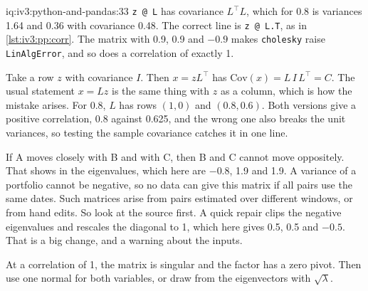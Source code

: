 \begin{solution}{iq:iv3:python-and-pandas:33}
\texttt{z @ L} has covariance $L^\top L$, which for 0.8 is variances 1.64 and 0.36 with covariance 0.48. The correct line is \texttt{z @ L.T}, as in \cref{lst:iv3:pp:corr}. The matrix with 0.9, 0.9 and $-0.9$ makes \texttt{cholesky} raise \texttt{LinAlgError}, and so does a correlation of exactly 1.
\label{lst:iv3:pp:corr}

Take a row $z$ with covariance $I$. Then $x = z L^\top$ has $\text{Cov}(x) = L\, I\, L^\top = C$. The usual statement $x = L z$ is the same thing with $z$ as a column, which is how the mistake arises. For 0.8, $L$ has rows $(1, 0)$ and $(0.8, 0.6)$. Both versions give a positive correlation, 0.8 against 0.625, and the wrong one also breaks the unit variances, so testing the sample covariance catches it in one line.

If A moves closely with B and with C, then B and C cannot move oppositely. That shows in the eigenvalues, which here are $-0.8$, 1.9 and 1.9. A variance of a portfolio cannot be negative, so no data can give this matrix if all pairs use the same dates. Such matrices arise from pairs estimated over different windows, or from hand edits. So look at the source first. A quick repair clips the negative eigenvalues and rescales the diagonal to 1, which here gives 0.5, 0.5 and $-0.5$. That is a big change, and a warning about the inputs.

At a correlation of 1, the matrix is singular and the factor has a zero pivot. Then use one normal for both variables, or draw from the eigenvectors with $\sqrt{\lambda}$.

\end{solution}

